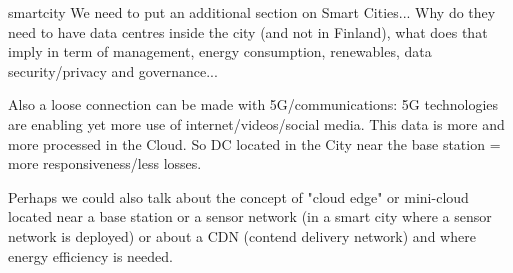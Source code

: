 smartcity
We need to put an additional section on Smart Cities... Why do they need to have data centres inside the city (and not in Finland), what does that imply in term of management, energy consumption, renewables, data security/privacy and governance...

Also a loose connection can be made with 5G/communications: 5G technologies are enabling yet more use of internet/videos/social media. This data is more and more processed in the Cloud. So DC located in the City near the base station = more responsiveness/less losses.

Perhaps we could also talk about the concept of "cloud edge" or mini-cloud located near a base station or a sensor network (in a smart city where a sensor network is deployed) or about a CDN (contend delivery network) and where energy efficiency is needed.